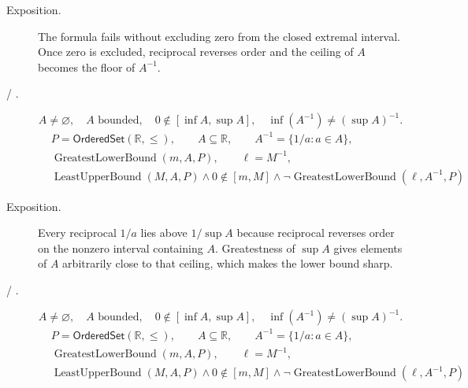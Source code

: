 \begin{remark*}
\begin{description}
  \item[Exposition.]
The formula fails without excluding zero from the closed extremal interval.
Once zero is excluded, reciprocal reverses order and the ceiling of $A$ becomes
the floor of $A^{-1}$.


  \item[ / .]
  \[
A\neq\varnothing,\quad A\text{ bounded},\quad 0\notin[\inf A,\sup A],
\quad
\inf(A^{-1})\neq(\sup A)^{-1}.
\]
\[
\begin{aligned}
&P=\mathsf{OrderedSet}(\mathbb{R},\leq),\qquad A\subseteq\mathbb{R},\qquad A^{-1}=\{1/a:a\in A\},\\
&\operatorname{GreatestLowerBound}(m,A,P),\qquad \ell=M^{-1},\\
&\operatorname{LeastUpperBound}(M,A,P)\land 0\notin[m,M]\land
\neg\operatorname{GreatestLowerBound}(\ell,A^{-1},P)
\end{aligned}
\]
\end{description}
\end{remark*}

\begin{remark*}
\begin{description}
  \item[Exposition.]
Every reciprocal $1/a$ lies above $1/\sup A$ because reciprocal reverses order
on the nonzero interval containing $A$.  Greatestness of $\sup A$ gives
elements of $A$ arbitrarily close to that ceiling, which makes the lower bound
sharp.


  \item[ / .]
  \[
A\neq\varnothing,\quad A\text{ bounded},\quad 0\notin[\inf A,\sup A],
\quad
\inf(A^{-1})\neq(\sup A)^{-1}.
\]
\[
\begin{aligned}
&P=\mathsf{OrderedSet}(\mathbb{R},\leq),\qquad A\subseteq\mathbb{R},\qquad A^{-1}=\{1/a:a\in A\},\\
&\operatorname{GreatestLowerBound}(m,A,P),\qquad \ell=M^{-1},\\
&\operatorname{LeastUpperBound}(M,A,P)\land 0\notin[m,M]\land
\neg\operatorname{GreatestLowerBound}(\ell,A^{-1},P)
\end{aligned}
\]
\end{description}
\end{remark*}

